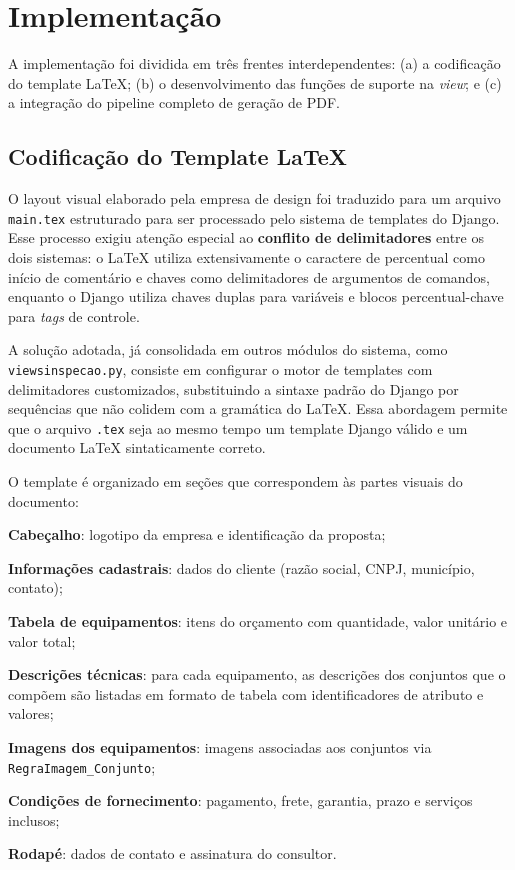 \section{Implementação}
\label{sec:implementacao}

A implementação foi dividida em três frentes interdependentes: (a) a codificação do template LaTeX;
(b) o desenvolvimento das funções de suporte na \textit{view}; e (c) a integração do pipeline completo
de geração de PDF.

\subsection{Codificação do Template LaTeX}

O layout visual elaborado pela empresa de design foi traduzido para um arquivo \texttt{main.tex}
estruturado para ser processado pelo sistema de templates do Django. Esse processo exigiu atenção
especial ao \textbf{conflito de delimitadores} entre os dois sistemas: o LaTeX utiliza extensivamente
o caractere de percentual como início de comentário e chaves como delimitadores de argumentos de
comandos, enquanto o Django utiliza chaves duplas para variáveis e blocos percentual-chave para
\textit{tags} de controle.

A solução adotada, já consolidada em outros módulos do sistema, como \texttt{viewsinspecao.py},
consiste em configurar o motor de templates com delimitadores customizados, substituindo a sintaxe
padrão do Django por sequências que não colidem com a gramática do LaTeX. Essa abordagem permite que
o arquivo \texttt{.tex} seja ao mesmo tempo um template Django válido e um documento LaTeX
sintaticamente correto.

O template é organizado em seções que correspondem às partes visuais do documento:

\begin{alineas}
    \item \textbf{Cabeçalho}: logotipo da empresa e identificação da proposta;
    \item \textbf{Informações cadastrais}: dados do cliente (razão social, CNPJ, município, contato);
    \item \textbf{Tabela de equipamentos}: itens do orçamento com quantidade, valor unitário e
    valor total;
    \item \textbf{Descrições técnicas}: para cada equipamento, as descrições dos conjuntos que o
    compõem são listadas em formato de tabela com identificadores de atributo e valores;
    \item \textbf{Imagens dos equipamentos}: imagens associadas aos conjuntos via
    \texttt{RegraImagem\_Conjunto};
    \item \textbf{Condições de fornecimento}: pagamento, frete, garantia, prazo e serviços inclusos;
    \item \textbf{Rodapé}: dados de contato e assinatura do consultor.
\end{alineas}

